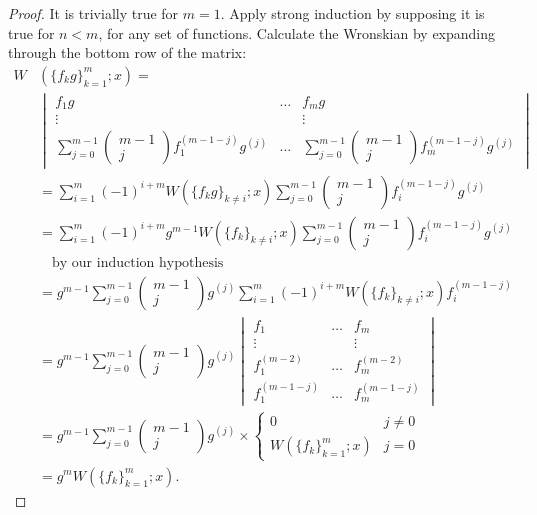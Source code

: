 \documentclass{book}
\begin{document}
\begin{proof}
It is trivially true for $m=1$.
Apply strong induction by supposing it is true for $n<m$, for any set of functions.
Calculate the Wronskian by expanding through the bottom row of the matrix:
\begin{align*}
W & (\{ f_k g \}_{k=1}^m ; x) = \\
& \begin{vmatrix}
f_1 g & \dots & f_m g \\
\vdots & & \vdots \\
\sum_{j=0}^{m-1} \begin{pmatrix} m-1 \\ j \end{pmatrix} f_1^{(m-1-j)} g^{(j)}
& \dots & \sum_{j=0}^{m-1} \begin{pmatrix} m-1 \\ j \end{pmatrix} f_m^{(m-1-j)} g^{(j)}
\end{vmatrix} \\
& = \sum_{i=1}^m (-1)^{i+m} W(\{f_k g\}_{k \neq i} ; x) \sum_{j=0}^{m-1} \begin{pmatrix} m-1 \\ j \end{pmatrix} f_i^{(m-1-j)} g^{(j)} \\
& = \sum_{i=1}^m (-1)^{i+m} g^{m-1} W(\{ f_k \}_{k \neq i} ; x) \sum_{j=0}^{m-1} \begin{pmatrix} m-1 \\ j \end{pmatrix} f_i^{(m-1-j)} g^{(j)} \\
& \quad \text{by our induction hypothesis} \\
& = g^{m-1} \sum_{j=0}^{m-1} \begin{pmatrix} m-1 \\ j \end{pmatrix} g^{(j)}
\sum_{i=1}^m (-1)^{i+m} W(\{f_k\}_{k\neq i} ; x) f_i^{(m-1-j)} \\
& = g^{m-1} \sum_{j=0}^{m-1} \begin{pmatrix} m-1 \\ j \end{pmatrix} g^{(j)}
\begin{vmatrix} f_1 & \dots & f_m \\
\vdots & & \vdots \\
f_1^{(m-2)} & \dots & f_m^{(m-2)} \\
f_1^{(m-1-j)} & \dots & f_m^{(m-1-j)} \end{vmatrix} \\
& = g^{m-1} \sum_{j=0}^{m-1} \begin{pmatrix} m-1 \\ j \end{pmatrix} g^{(j)} \times \begin{cases} 0 & j\neq 0 \\
W(\{f_k\}_{k=1}^m ; x) & j = 0 \end{cases} \\
& = g^m W(\{f_k\}_{k=1}^m ; x) .
\end{align*}
\end{proof}
\end{document}
